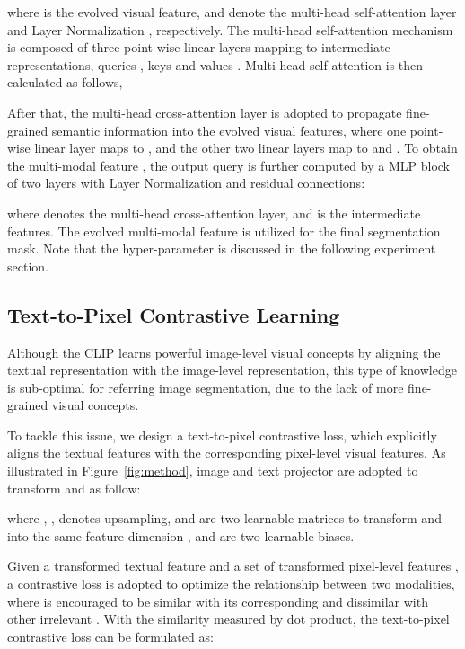 \documentclass[10pt,twocolumn,letterpaper]{article}
\begin{document}
where  is the evolved visual feature,  and  denote the multi-head self-attention layer and Layer Normalization \cite{ba2016layer}, respectively.
The multi-head self-attention mechanism is composed of three point-wise linear layers mapping  to intermediate representations, queries , keys  and values .
Multi-head self-attention is then calculated as follows,

After that, the multi-head cross-attention layer is adopted to propagate fine-grained semantic information into the evolved visual features,
where one point-wise linear layer maps  to , and the other two linear layers map  to  and .
To obtain the multi-modal feature , the output query  is further computed by a MLP block of two layers with Layer Normalization and residual connections:

where  denotes the multi-head cross-attention layer, and  is the intermediate features.
The evolved multi-modal feature  is utilized for the final segmentation mask.
Note that the hyper-parameter  is discussed in the following experiment section.

\subsection{Text-to-Pixel Contrastive Learning}
Although the CLIP \cite{radford2021learning} learns powerful image-level visual concepts by aligning the textual representation with the image-level representation,
this type of knowledge is sub-optimal for referring image segmentation, due to the lack of more fine-grained visual concepts.

To tackle this issue, we design a text-to-pixel contrastive loss,
which explicitly aligns the textual features with the corresponding pixel-level visual features.
As illustrated in Figure~\ref{fig:method}, image and text projector are adopted to transform  and  as follow:

where , ,
 denotes  upsampling,
 and  are two learnable matrices to transform  and  into the same feature dimension ,
 and  are two learnable biases.

Given a transformed textual feature  and a set of transformed pixel-level features ,
a contrastive loss is adopted to optimize the relationship between two modalities,
where  is encouraged to be similar with its corresponding  and dissimilar with other irrelevant .
With the similarity measured by dot product, the text-to-pixel contrastive loss can be formulated as:

\vspace{-4.0mm}
\end{document}
